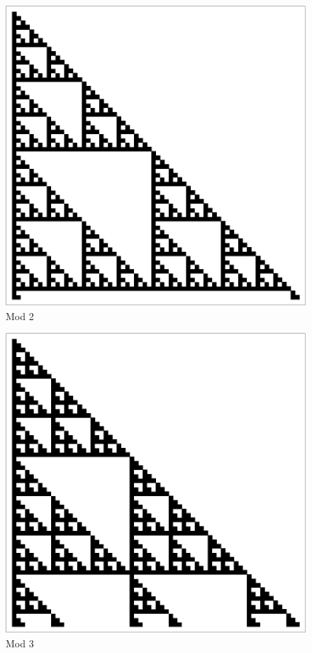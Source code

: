 \documentclass{beamer}
\begin{document}
\begin{frame}
    \begin{figure}
        \centering
        \begin{minipage}[c]{.45\textwidth}
            \includegraphics[width=1\linewidth,clip]{mod6Initalmod2.pdf}
            \centering
            Mod 2
        \end{minipage}
        \hfill
        \begin{minipage}[c]{.45\textwidth}
            \includegraphics[width=1\linewidth,clip]{Mod6InitalMod3.pdf}
            \centering
            Mod 3
        \end{minipage}
    \end{figure}
\end{frame}
\end{document}
